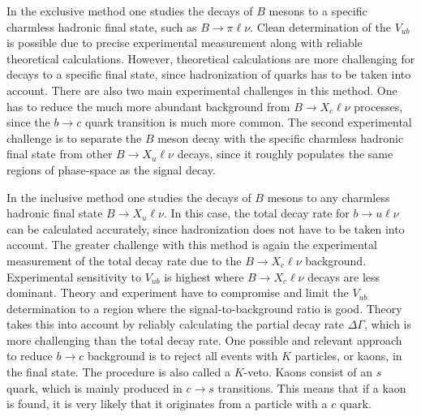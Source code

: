 \documentclass[headings=standardclasses,headings=big,oneside,a4paper,openany,12pt]{scrbook}
\begin{document}
In the exclusive method one studies the decays of $B$ mesons to a specific charmless hadronic final state, such as $B \rightarrow \pi \ell \nu$. Clean determination of the $V_{ub}$ is possible due to precise experimental measurement along with reliable theoretical calculations. However, theoretical calculations are more challenging for decays to a specific final state, since hadronization of quarks has to be taken into account. There are also two main experimental challenges in this method. One has to reduce the much more abundant background from $B \rightarrow X_c \ell \nu$ processes, since the $b \rightarrow c$ quark transition is much more common. The second experimental challenge is to separate the $B$ meson decay with the specific charmless hadronic final state from other $B \rightarrow X_u \ell \nu$ decays, since it roughly populates the same regions of phase-space as the signal decay.

In the inclusive method one studies the decays of $B$ mesons to any charmless hadronic final state $B \to X_u \ell \nu$. In this case, the total decay rate for $b \rightarrow u \ell \nu$ can be calculated accurately, since hadronization does not have to be taken into account. The greater challenge with this method is again the experimental measurement of the total decay rate due to the $B \rightarrow X_c \ell \nu$ background. Experimental sensitivity to $V_{ub}$ is highest where $B \rightarrow X_c \ell \nu$ decays are less dominant. Theory and experiment have to compromise and limit the $V_{ub}$ determination to a region where the signal-to-background ratio is good. Theory takes this into account by reliably calculating the partial decay rate $\Delta \Gamma$, which is more challenging than the total decay rate. One possible and relevant approach to reduce $b \rightarrow c$ background is to reject all events with $K$ particles, or kaons, in the final state. The procedure is also called a $K$-veto. Kaons consist of an $s$ quark, which is mainly produced in $c \rightarrow s$ transitions. This means that if a kaon is found, it is very likely that it originates from a particle with a $c$ quark. 
\end{document}
